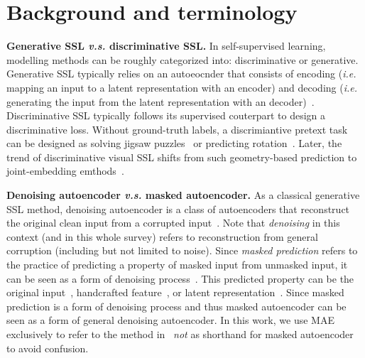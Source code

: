 \documentclass[10pt,journal,compsoc]{IEEEtran}
\begin{document}
\section{Background and terminology} \label{sec:terminology}

\textbf{Generative SSL \textit{v.s.} discriminative SSL.} In self-supervised learning, modelling methods can be roughly categorized into: discriminative or generative. Generative SSL typically relies on an autoeocnder that consists of encoding (\textit{i.e.} mapping an input to a latent representation with an encoder) and decoding (\textit{i.e.} generating the input from the latent representation with an decoder)~\cite{ng2011sparse}. Discriminative SSL typically follows its supervised couterpart to design a discriminative loss. Without ground-truth labels, a discrimiantive pretext task can be designed as solving jigsaw puzzles~\cite{noroozi2016unsupervised} or predicting rotation~\cite{gidaris2018unsupervised}. Later, the trend of discriminative visual SSL shifts from such geometry-based prediction to joint-embedding emthods~\cite{zhang2022how,zhang2022dual,jing2021understanding}.



\textbf{Denoising autoencoder \textit{v.s.} masked autoencoder.} As a classical generative SSL method, denoising autoencoder is a class of autoencoders that reconstruct the original clean input from a corrupted input~\cite{vincent2008extracting,vincent2010stacked}. Note that \textit{denoising} in this context (and in this whole survey) refers to reconstruction from general corruption (including but not limited to noise). Since \textit{masked prediction} refers to the practice of predicting a property of masked input from unmasked input, it can be seen as a form of denoising process~\cite{yi2022masked}. This predicted property can be the original input~\cite{yi2022masked}, handcrafted feature~\cite{wei2022masked}, or latent representation~\cite{baevski2022data2vec}. Since masked prediction is a form of denoising process and thus masked autoencoder can be seen as a form of general denoising autoencoder. In this work, we use MAE exclusively to refer to the method in~\cite{he2022masked} \textit{not} as shorthand for masked autoencoder to avoid confusion. 
\end{document}
